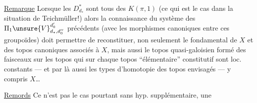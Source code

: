 
\uline{Remarque} Lorsque les $D_{d_*}^{*}$ sont tous des $K(\pi,1)$ (ce qui est le cas dans la situation de Teichmüller!) alors la connaissance du système des $\Pi_1\unsure{V}_{d_*,d''_0}^{d'_0}$ précédents (avec les morphismes canoniques entre ces groupoïdes) doit permettre de reconstituer, non seulement le   fondamental de $X$ et des  topos canoniques associés à $X$, mais aussi le topos quasi-galoisien formé des faisceaux sur les topos qui sur chaque topos ``élémentaire'' constitutif sont loc. constants --- et par là aussi les types d'homotopie des topos envisagés --- y compris $X$\ldots


\uline{Remords} Ce n'est pas le cas pourtant sans hyp. supplémentaire,  une 

